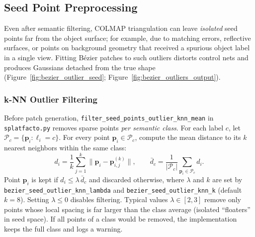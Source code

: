 \documentclass{report}
\newcommand{\filepath}[1]{\nolinkurl{#1}}
\newcommand{\code}[1]{\nolinkurl{#1}}
\begin{document}
\subsection{Seed Point Preprocessing}
\label{subsec:seed_preprocessing}

Even after semantic filtering, COLMAP triangulation can leave \emph{isolated} seed points far from the object surface; for example, due to matching errors, reflective surfaces, or points on background geometry that received a spurious object label in a single view. Fitting B\'ezier patches to such outliers distorts control nets and produces Gaussians detached from the true shape (Figure~\ref{fig:bezier_outlier_seed}; Figure~\ref{fig:bezier_outliers_output}).

\subsubsection{k-NN Outlier Filtering}
\label{subsec:knn_outlier}

Before patch generation, \texttt{filter\_seed\_points\_outlier\_knn\_mean} in \filepath{splatfacto.py} removes sparse points \emph{per semantic class}. For each label $c$, let $\mathcal{P}_c=\{\mathbf{p}_i:\ell_i=c\}$. For every point $\mathbf{p}_i\in\mathcal{P}_c$, compute the mean distance to its $k$ nearest neighbors within the same class:
\begin{equation}
d_i = \frac{1}{k}\sum_{j=1}^{k}\|\mathbf{p}_i-\mathbf{p}_{i,j}^{(k)}\|,
\qquad
\bar{d}_c = \frac{1}{|\mathcal{P}_c|}\sum_{\mathbf{p}_i\in\mathcal{P}_c} d_i.
\label{eq:knn_mean_dist}
\end{equation}
Point $\mathbf{p}_i$ is kept if $d_i \le \lambda\,\bar{d}_c$ and discarded otherwise, where $\lambda$ and $k$ are set by \code{bezier\_seed\_outlier\_knn\_lambda} and \code{bezier\_seed\_outlier\_knn\_k} (default $k=8$). Setting $\lambda\le 0$ disables filtering. Typical values $\lambda\in[2,3]$ remove only points whose local spacing is far larger than the class average (isolated ``floaters'' in seed space). If all points of a class would be removed, the implementation keeps the full class and logs a warning.
\end{document}
